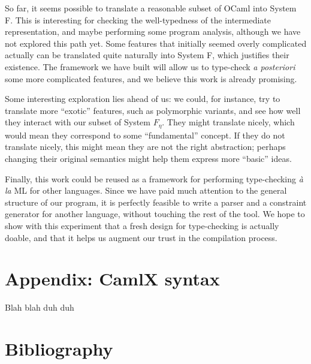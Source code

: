 \documentclass[10pt,a4paper,twoside,titlepage,twocolumn]{article}
\begin{document}
So far, it seems possible to translate a reasonable subset of OCaml into System
F. This is interesting for checking the well-typedness of the intermediate
representation, and maybe performing some program analysis, although we have not
explored this path yet. Some features that initially seemed overly complicated
actually can be translated quite naturally into System F, which justifies their
existence. The framework we have built will allow us to type-check \emph{a
posteriori} some more complicated features, and we believe this work is already
promising.

Some interesting exploration lies ahead of us: we could, for instance, try to
translate more ``exotic'' features, such as polymorphic variants, and see how
well they interact with our subset of System $F_\eta$. They might translate
nicely, which would mean they correspond to some ``fundamental'' concept. If
they do not translate nicely, this might mean they are not the right
abstraction; perhaps changing their original semantics might help them express
more ``basic'' ideas.

Finally, this work could be reused as a framework for performing type-checking
\emph{à la} ML for other languages. Since we have paid much attention to the
general structure of our program, it is perfectly feasible to write a parser and
a constraint generator for another language, without touching the rest of the
tool. We hope to show with this experiment that a fresh design for type-checking
is actually doable, and that it helps us augment our trust in the compilation
process.

\part{Appendix: CamlX syntax}

Blah blah duh duh

\part{Bibliography}



\end{document}
